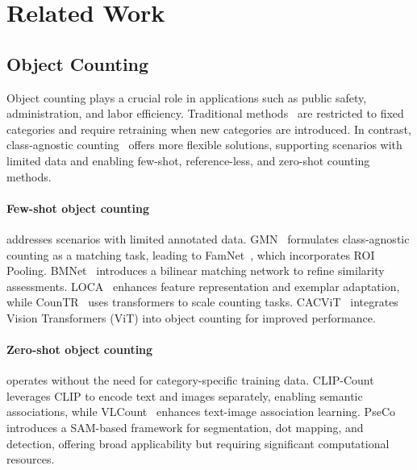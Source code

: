 \section{Related Work}
\subsection{Object Counting}
Object counting plays a crucial role in applications such as public safety, administration, and labor efficiency. Traditional methods~\cite{ranjan2022exemplar, shi2022represent, yang2021class, you2023few} are restricted to fixed categories and require retraining when new categories are introduced. In contrast, class-agnostic counting~\cite{lu2019class, gong2022class, nguyen2022few, lin2024gramformer, du2023domain} offers more flexible solutions, supporting scenarios with limited data and enabling few-shot, reference-less, and zero-shot counting methods.

\vspace{-10pt}
\paragraph{Few-shot object counting} addresses scenarios with limited annotated data. GMN~\cite{lu2019class} formulates class-agnostic counting as a matching task, leading to FamNet~\cite{ranjan2021learning}, which incorporates ROI Pooling. BMNet~\cite{shi2022represent} introduces a bilinear matching network to refine similarity assessments. LOCA~\cite{djukic2023low} enhances feature representation and exemplar adaptation, while CounTR~\cite{liu2022countr} uses transformers to scale counting tasks. CACViT~\cite{WangX0024} integrates Vision Transformers (ViT) into object counting for improved performance.

\vspace{-10pt}
\paragraph{Zero-shot object counting} operates without the need for category-specific training data. CLIP-Count~\cite{jiang2023clip} leverages CLIP to encode text and images separately, enabling semantic associations, while VLCount~\cite{kang2023vlcounter} enhances text-image association learning. PseCo~\cite{huang2023point} introduces a SAM-based framework for segmentation, dot mapping, and detection, offering broad applicability but requiring significant computational resources.

\vspace{-10pt}
